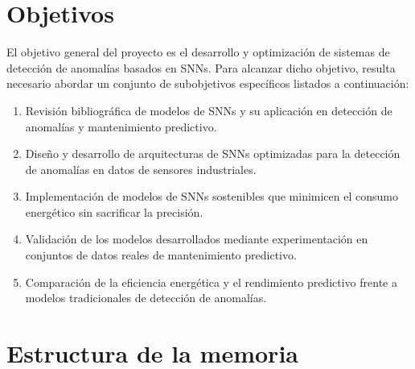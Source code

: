 \section{Objetivos}

El objetivo general del proyecto es el desarrollo y optimización de sistemas de detección de anomalías basados en SNNs. Para alcanzar dicho objetivo, resulta necesario abordar un conjunto de subobjetivos específicos listados a continuación:

\begin{enumerate}
    \item Revisión bibliográfica de modelos de SNNs y su aplicación en detección de anomalías y mantenimiento predictivo.
    \item Diseño y desarrollo de arquitecturas de SNNs optimizadas para la detección de anomalías en datos de sensores industriales.
    \item Implementación de modelos de SNNs sostenibles que minimicen el consumo energético sin sacrificar la precisión.
    \item Validación de los modelos desarrollados mediante experimentación en conjuntos de datos reales de mantenimiento predictivo.
    \item Comparación de la eficiencia energética y el rendimiento predictivo frente a modelos tradicionales de detección de anomalías.
\end{enumerate}


\section{Estructura de la memoria}


